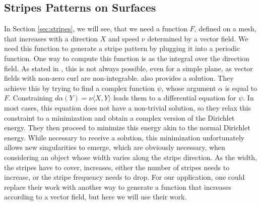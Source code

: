 \documentclass{utue} %
\begin{document}
\subsection{Stripes Patterns on Surfaces}
In Section \ref{sec:stripes}, we will see, that we need a function $F$, defined on a mesh, that increases with a direction $X$ and speed $\nu$ determined by a vector field. We need this function to generate a stripe pattern by plugging it into a periodic function. One way to compute this function is as the integral over the direction field. As stated in \cite{stripes}, this is not always possible, even for a simple plane, as vector fields with non-zero curl are non-integrable. \cite{stripes} also provides a solution. They achieve this by trying to find a complex function $\psi$, whose argument $\alpha$ is equal to $F$. Constraining $d\alpha(Y) = \nu\langle X,Y\rangle$ leads them to a differential equation for $\psi$. In most cases, this equation does not have a non-trivial solution, so they relax this constraint to a minimization and obtain a complex version of the Dirichlet energy. They then proceed to minimize this energy akin to the normal Dirichlet energy. While necessary to receive a solution, this minimization unfortunately allows new singularities to emerge, which are obviously necessary, when considering an object whose width varies along the stripe direction. As the width, the stripes have to cover, increases, either the number of stripes needs to increase, or the stripe frequency needs to drop. For our application, one could replace their work with another way to generate a function that increases according to a vector field, but here we will use their work.
\end{document}
